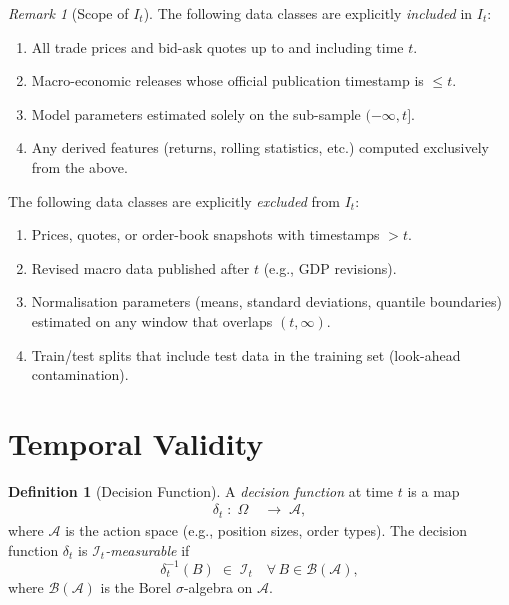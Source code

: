 \documentclass[12pt,openany]{book}
\newcommand{\calI}{\mathcal{I}}
\numberwithin{equation}{chapter}
\theoremstyle{plain}
\theoremstyle{definition}
\newtheorem{definition}[theorem]{Definition}
\theoremstyle{remark}
\newtheorem{remark}[theorem]{Remark}
\numberwithin{equation}{chapter}
\theoremstyle{plain}
\def\calI{I}%
\begin{document}
\begin{remark}[Scope of $\calI_t$]
\label{rem:info-scope}
The following data classes are explicitly \emph{included} in
$\calI_t$:
\begin{enumerate}
  \item All trade prices and bid-ask quotes up to and including
        time $t$.
  \item Macro-economic releases whose official publication timestamp
        is $\leq t$.
  \item Model parameters estimated solely on the sub-sample
        $(-\infty, t]$.
  \item Any derived features (returns, rolling statistics, etc.)
        computed exclusively from the above.
\end{enumerate}
The following data classes are explicitly \emph{excluded} from
$\calI_t$:
\begin{enumerate}
  \item Prices, quotes, or order-book snapshots with timestamps
        $> t$.
  \item Revised macro data published after $t$ (e.g., GDP
        revisions).
  \item Normalisation parameters (means, standard deviations,
        quantile boundaries) estimated on any window that overlaps
        $(t, \infty)$.
  \item Train/test splits that include test data in the training
        set (look-ahead contamination).
\end{enumerate}
\end{remark}

\section{Temporal Validity}

\begin{definition}[Decision Function]
\label{def:decision-fn}
\label{def:measurability}
A \emph{decision function} at time $t$ is a map
\begin{align}
  \delta_t \;:\; \Omega &\;\longrightarrow\; \mathcal{A},
  \label{eq:decision-fn}
\end{align}
where $\mathcal{A}$ is the action space (e.g., position sizes, order
types). The decision function $\delta_t$ is
\emph{$\mathcal{I}_t$-measurable} if
\begin{equation}
  \delta_t^{-1}(B) \;\in\; \mathcal{I}_t
  \quad \forall\, B \in \mathcal{B}(\mathcal{A}),
  \label{eq:measurability}
\end{equation}
where $\mathcal{B}(\mathcal{A})$ is the Borel $\sigma$-algebra on
$\mathcal{A}$.
\end{definition}
\end{document}
